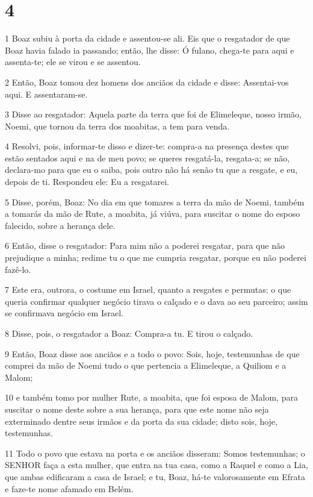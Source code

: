 \chapter{4}

\par 1 Boaz subiu à porta da cidade e assentou-se ali. Eis que o resgatador de que Boaz havia falado ia passando; então, lhe disse: Ó fulano, chega-te para aqui e assenta-te; ele se virou e se assentou.
\par 2 Então, Boaz tomou dez homens dos anciãos da cidade e disse: Assentai-vos aqui. E assentaram-se.
\par 3 Disse ao resgatador: Aquela parte da terra que foi de Elimeleque, nosso irmão, Noemi, que tornou da terra dos moabitas, a tem para venda.
\par 4 Resolvi, pois, informar-te disso e dizer-te: compra-a na presença destes que estão sentados aqui e na de meu povo; se queres resgatá-la, resgata-a; se não, declara-mo para que eu o saiba, pois outro não há senão tu que a resgate, e eu, depois de ti. Respondeu ele: Eu a resgatarei.
\par 5 Disse, porém, Boaz: No dia em que tomares a terra da mão de Noemi, também a tomarás da mão de Rute, a moabita, já viúva, para suscitar o nome do esposo falecido, sobre a herança dele.
\par 6 Então, disse o resgatador: Para mim não a poderei resgatar, para que não prejudique a minha; redime tu o que me cumpria resgatar, porque eu não poderei fazê-lo.
\par 7 Este era, outrora, o costume em Israel, quanto a resgates e permutas: o que queria confirmar qualquer negócio tirava o calçado e o dava ao seu parceiro; assim se confirmava negócio em Israel.
\par 8 Disse, pois, o resgatador a Boaz: Compra-a tu. E tirou o calçado.
\par 9 Então, Boaz disse aos anciãos e a todo o povo: Sois, hoje, testemunhas de que comprei da mão de Noemi tudo o que pertencia a Elimeleque, a Quiliom e a Malom;
\par 10 e também tomo por mulher Rute, a moabita, que foi esposa de Malom, para suscitar o nome deste sobre a sua herança, para que este nome não seja exterminado dentre seus irmãos e da porta da sua cidade; disto sois, hoje, testemunhas.
\par 11 Todo o povo que estava na porta e os anciãos disseram: Somos testemunhas; o SENHOR faça a esta mulher, que entra na tua casa, como a Raquel e como a Lia, que ambas edificaram a casa de Israel; e tu, Boaz, há-te valorosamente em Efrata e faze-te nome afamado em Belém.
